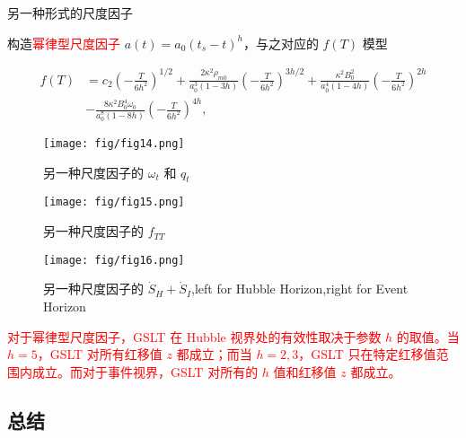 \documentclass[9pt, dvipsnames]{beamer} %
\begin{document}
\begin{frame}{另一种形式的尺度因子}

    构造\textcolor{red}{幂律型尺度因子} $a(t)=a_0(t_s-t)^h$，与之对应的 $f(T)$ 模型
    
    $$
    \begin{aligned}
        f(T)
        &=c_2\left(-\frac{T }{6h^2 }  \right)^{1/2} + \frac{2\kappa^2\rho_{m0} }{a_0^3(1-3h) } \left(-\frac{T }{6h^2 }  \right)^{3h/2} + \frac{\kappa^2 B_0^2 }{a_0^4(1-4h) } \left(-\frac{T }{6h^2 }  \right)^{2h} \\
        &- \frac{8\kappa^2 B_0^4 \omega_0 }{a_0^8(1-8h) } \left(-\frac{T }{6h^2 }  \right)^{4h},
    \end{aligned}
    $$
    \begin{figure}
        \centering
        \texttt{[image: fig/fig14.png]}
        \caption{另一种尺度因子的 $\omega_t$ 和 $q_t$}
    \end{figure}
\end{frame}
    
\begin{frame}
    \begin{figure}
        \centering
        \texttt{[image: fig/fig15.png]}
        \caption{另一种尺度因子的 $f_{TT}$}
    \end{figure}
    \begin{figure}
        \centering
        \texttt{[image: fig/fig16.png]}
        \caption{另一种尺度因子的 $\dot{S}_H+\dot{S}_I$,left for Hubble Horizon,right for Event Horizon}
    \end{figure}

    \textcolor{red}{对于幂律型尺度因子，GSLT 在 Hubble 视界处的有效性取决于参数 $h$ 的取值。当 $h=5$，GSLT 对所有红移值 $z$ 都成立；而当 $h=2,3$，GSLT 只在特定红移值范围内成立。而对于事件视界，GSLT 对所有的 $h$ 值和红移值 $z$ 都成立。}

\end{frame}

\subsection{总结}
\end{document}
